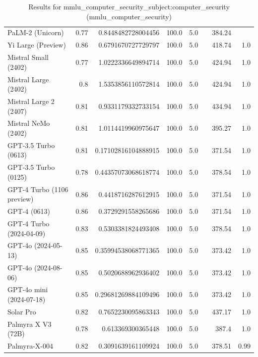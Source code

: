 \begin{table}[htp]
{\begin{tabular}{lrrrrrrr}
PaLM-2 (Unicorn) & 0.77 & 0.8448482728004456 & 100.0 & 5.0 &  & 384.24 &  \\
Yi Large (Preview) & 0.86 & 0.6791670727729797 & 100.0 & 5.0 &  & 418.74 & 1.0 \\
Mistral Small (2402) & 0.77 & 1.0222336649894714 & 100.0 & 5.0 &  & 424.94 & 1.0 \\
Mistral Large (2402) & 0.8 & 1.5353856110572814 & 100.0 & 5.0 &  & 424.94 & 1.0 \\
Mistral Large 2 (2407) & 0.81 & 0.9331179332733154 & 100.0 & 5.0 &  & 434.94 & 1.0 \\
Mistral NeMo (2402) & 0.81 & 1.0114419960975647 & 100.0 & 5.0 &  & 395.27 & 1.0 \\
GPT-3.5 Turbo (0613) & 0.81 & 0.17102816104888915 & 100.0 & 5.0 &  & 371.54 & 1.0 \\
GPT-3.5 Turbo (0125) & 0.78 & 0.44357073068618774 & 100.0 & 5.0 &  & 378.54 & 1.0 \\
GPT-4 Turbo (1106 preview) & 0.86 & 0.4418716287612915 & 100.0 & 5.0 &  & 371.54 & 1.0 \\
GPT-4 (0613) & 0.86 & 0.3729291558265686 & 100.0 & 5.0 &  & 371.54 & 1.0 \\
GPT-4 Turbo (2024-04-09) & 0.83 & 0.5303381824493408 & 100.0 & 5.0 &  & 378.54 & 1.0 \\
GPT-4o (2024-05-13) & 0.85 & 0.35994538068771365 & 100.0 & 5.0 &  & 373.42 & 1.0 \\
GPT-4o (2024-08-06) & 0.85 & 0.5020688962936402 & 100.0 & 5.0 &  & 373.42 & 1.0 \\
GPT-4o mini (2024-07-18) & 0.85 & 0.29681269884109496 & 100.0 & 5.0 &  & 373.42 & 1.0 \\
Solar Pro & 0.82 & 0.7652230095863343 & 100.0 & 5.0 &  & 437.17 & 1.0 \\
Palmyra X V3 (72B) & 0.78 & 0.613369300365448 & 100.0 & 5.0 &  & 387.4 & 1.0 \\
Palmyra-X-004 & 0.82 & 0.3091639161109924 & 100.0 & 5.0 &  & 378.51 & 0.99 \\
\bottomrule
\end{tabular}}
\caption{Results for mmlu_computer_security_subject:computer_security (mmlu_computer_security)}
\label{fig:mmlu_computer_security_subject:computer_security (mmlu_computer_security)}
\end{table}